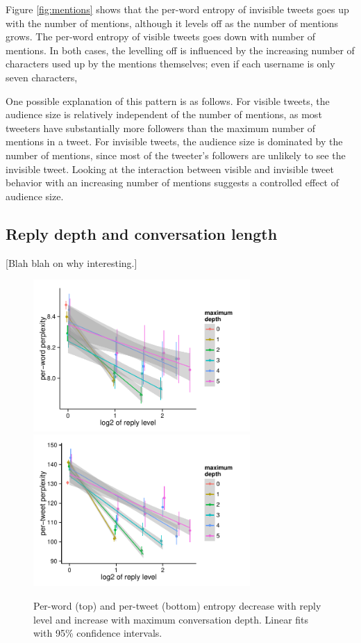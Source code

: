 \documentclass[11pt,letterpaper]{article}
\begin{document}
Figure \ref{fig:mentions} shows that the per-word entropy of invisible tweets goes up with the number of mentions, although it levels off as the number of mentions grows.  The per-word entropy of visible tweets goes down with number of mentions.  In both cases, the levelling off is influenced by the increasing number of characters used up by the mentions themselves; even if each username is only seven characters,  

One possible explanation of this pattern is as follows. For visible tweets, the audience size is relatively independent of the number of mentions, as most tweeters have substantially more followers than the maximum number of mentions in a tweet.  For invisible tweets, the audience size is dominated by the number of mentions, since most of the tweeter's followers are unlikely to see the invisible tweet.  Looking at the interaction between visible and invisible tweet behavior with an increasing number of mentions suggests a controlled effect of audience size.

\subsection{Reply depth and conversation length}
[Blah blah on why interesting.]

\begin{figure}[t]
 \centering
  \includegraphics[width=3.25in]{figures/cmcl-rlevel-pw.pdf}
  \includegraphics[width=3.25in]{figures/cmcl-rlevel-pt.pdf}
 \caption{Per-word (top) and per-tweet (bottom) entropy decrease with reply level and increase with maximum conversation depth. Linear fits with 95\% confidence intervals.}\label{fig:rlevel-maxdesc}\vspace*{-.5em}
\end{figure}
\end{document}

